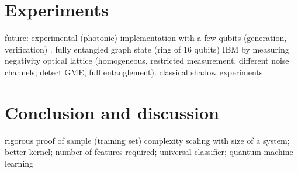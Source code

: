 \documentclass[
reprint,
aps,
pra,
floatfix,
]{revtex4-2}
\theoremstyle{plain}
\theoremstyle{definition}
\begin{document}



\section{Experiments}\label{sec:experiments}
future: experimental (photonic) implementation with a few qubits (generation, verification) \cite{luEntanglementStructureEntanglement2018}.
fully entangled graph state (ring of 16 qubits) IBM by measuring negativity \cite{wang16qubitIBMUniversal2018}
optical lattice \cite{zhouSchemeCreateVerify2022} (homogeneous, restricted measurement, different noise channels; detect GME, full entanglement).
classical shadow experiments \cite{zhangExperimentalQuantumState2021}
\cite{elbenMixedstateEntanglementLocal2020}

\section{Conclusion and discussion}
rigorous proof of sample (training set) complexity scaling with size of a system;
better kernel;
number of features required; 
universal classifier;
quantum machine learning

\begin{acknowledgments}
\end{acknowledgments}



%


\onecolumngrid
\appendix



\end{document}
